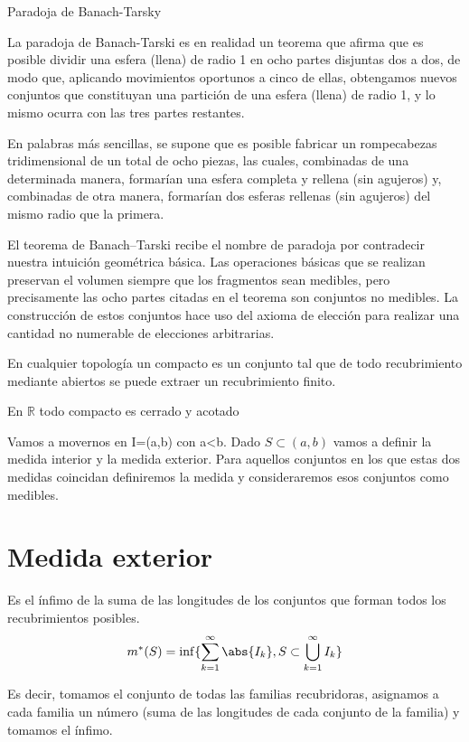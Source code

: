 \documentclass{apuntes}
\begin{document}
\begin{example}
Paradoja de Banach-Tarsky

La paradoja de Banach-Tarski es en realidad un teorema que afirma que es posible dividir una esfera (llena) de radio 1 en ocho partes disjuntas dos a dos, de modo que, aplicando movimientos oportunos a cinco de ellas, obtengamos nuevos conjuntos que constituyan una partición de una esfera (llena) de radio 1, y lo mismo ocurra con las tres partes restantes.

En palabras más sencillas, se supone que es posible fabricar un rompecabezas tridimensional de un total de ocho piezas, las cuales, combinadas de una determinada manera, formarían una esfera completa y rellena (sin agujeros) y, combinadas de otra manera, formarían dos esferas rellenas (sin agujeros) del mismo radio que la primera.

El teorema de Banach–Tarski recibe el nombre de paradoja por contradecir nuestra intuición geométrica básica. Las operaciones básicas que se realizan preservan el volumen siempre que los fragmentos sean medibles, pero precisamente las ocho partes citadas en el teorema son conjuntos no medibles. La construcción de estos conjuntos hace uso del axioma de elección para realizar una cantidad no numerable de elecciones arbitrarias.

\end{example}

\begin{defn}[Compacto]
En cualquier topología un compacto es un conjunto tal que de todo recubrimiento mediante abiertos se puede extraer un recubrimiento finito.
\end{defn}

\begin{theorem}
En $\mathbb{R}$ todo compacto es cerrado y acotado
\end{theorem}

Vamos  a movernos en I=(a,b) con a<b. Dado $S \subset (a,b)$  vamos a definir la medida interior y la medida exterior. Para aquellos conjuntos en los que estas dos medidas coincidan definiremos la medida y consideraremos esos conjuntos como medibles.

\section{Medida exterior}
\begin{defn} Es el ínfimo de la suma de las longitudes de los conjuntos que forman todos los recubrimientos posibles.
\[m^*(S) = \inf \lbrace \sum_{k=1}^{\infty} \abs{I_k}, S\subset \bigcup_{k=1}^{\infty} I_k \rbrace\]

Es decir, tomamos el conjunto de todas las familias recubridoras, asignamos a cada familia un número (suma de las longitudes de cada conjunto de la familia) y tomamos el ínfimo.
\end{defn}
\end{document}
